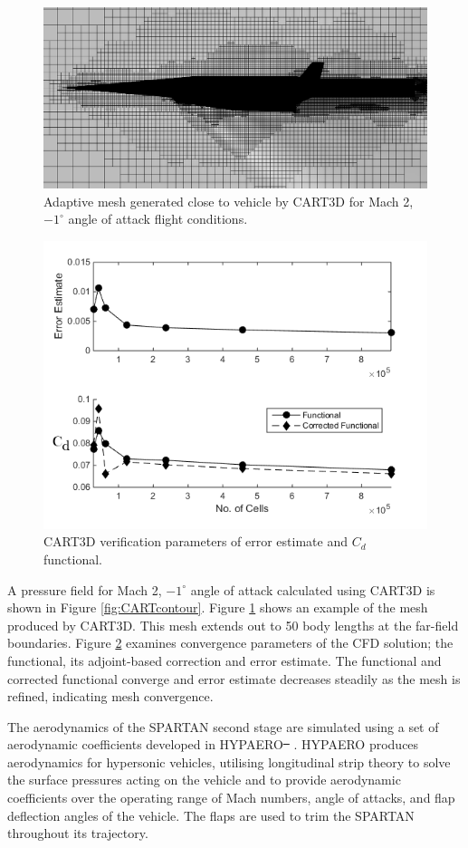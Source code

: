 \documentclass[journal]{new-aiaa}
\providecommand{\DIFadd}[1]{{\protect\color{blue}\uwave{#1}}} %
\providecommand{\DIFdel}[1]{{\protect\color{red}\sout{#1}}}                      %
\providecommand{\DIFaddbegin}{} %
\providecommand{\DIFaddend}{} %
\providecommand{\DIFdelbegin}{} %
\providecommand{\DIFdelend}{} %
\newcommand{\DIFscaledelfig}{0.5}
\newlength{\DIFdelgraphicswidth} %
\newlength{\DIFdelgraphicsheight} %
\newcommand{\DIFaddincludegraphics}[2][]{{\color{blue}\fbox{\DIFOincludegraphics[#1]{#2}}}} %
\newcommand{\DIFdelincludegraphics}[2][]{%
\sbox{\DIFdelgraphicsbox}{\DIFOincludegraphics[#1]{#2}}%
\settoboxwidth{\DIFdelgraphicswidth}{\DIFdelgraphicsbox} %
\settoboxtotalheight{\DIFdelgraphicsheight}{\DIFdelgraphicsbox} %
\scalebox{\DIFscaledelfig}{%
\parbox[b]{\DIFdelgraphicswidth}{\usebox{\DIFdelgraphicsbox}\\[-\baselineskip] \rule{\DIFdelgraphicswidth}{0em}}\llap{\resizebox{\DIFdelgraphicswidth}{\DIFdelgraphicsheight}{%
\setlength{\unitlength}{\DIFdelgraphicswidth}%
\begin{picture}(1,1)%
\thicklines\linethickness{2pt} %
{\color[rgb]{1,0,0}\put(0,0){\framebox(1,1){}}}%
{\color[rgb]{1,0,0}\put(0,0){\line( 1,1){1}}}%
{\color[rgb]{1,0,0}\put(0,1){\line(1,-1){1}}}%
\end{picture}%
}\hspace*{3pt}}} %
} %
\DeclareRobustCommand{\DIFaddbegin}{\DIFOaddbegin \let\includegraphics\DIFaddincludegraphics} %
\DeclareRobustCommand{\DIFaddend}{\DIFOaddend \let\includegraphics\DIFOincludegraphics} %
\DeclareRobustCommand{\DIFdelbegin}{\DIFOdelbegin \let\includegraphics\DIFdelincludegraphics} %
\DeclareRobustCommand{\DIFdelend}{\DIFOaddend \let\includegraphics\DIFOincludegraphics} %
\begin{document}
\begin{figure}[ht]
	\centering
	\includegraphics[width=0.6\linewidth]{CARTmesh}
	\caption{Adaptive mesh generated close to vehicle by CART3D for Mach 2, $-1^\circ$ angle of attack flight conditions.}
	\label{fig:CARTmesh}
\end{figure}
\begin{figure}[ht]
	\centering
	\includegraphics[width=0.4\linewidth]{CART}
	\caption{CART3D verification parameters of error estimate and $C_d$ functional.}
	\label{fig:CART}
\end{figure}
A pressure field for Mach 2, $-1^\circ$ angle of attack calculated using CART3D is shown in Figure \ref{fig:CARTcontour}. Figure \ref{fig:CARTmesh} shows an example of the mesh produced by CART3D. This mesh extends out to 50 body lengths at the far-field boundaries. Figure \ref{fig:CART} examines convergence parameters of the CFD solution; the functional, its adjoint-based correction and error estimate. The functional and corrected functional converge and error estimate decreases steadily as the mesh is refined, indicating mesh convergence.

The aerodynamics of the SPARTAN second stage are simulated using a set of aerodynamic coefficients developed in HYPAERO\DIFdelbegin \DIFdel{\mbox{%
\cite{Jazra2009,Preller2017}}%
}\DIFdelend \DIFaddbegin \DIFadd{\mbox{%
\cite{Jazra2009,Preller2017b}}%
}\DIFaddend . HYPAERO produces aerodynamics for hypersonic vehicles, utilising longitudinal strip theory to solve the surface pressures acting on the vehicle and to provide aerodynamic coefficients over the operating range of Mach numbers, angle of attacks, and flap deflection angles of the vehicle. The flaps are used to trim the SPARTAN throughout its trajectory. 
\end{document}
